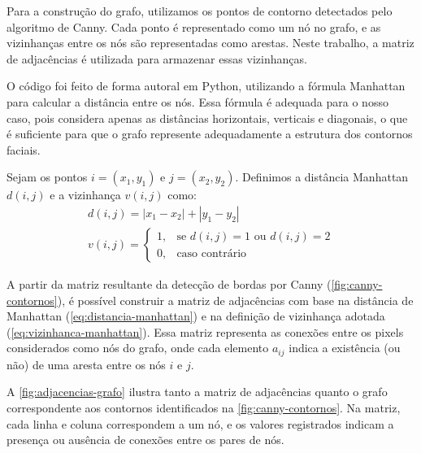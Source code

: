 Para a construção do grafo, utilizamos os pontos de contorno detectados pelo algoritmo de Canny. Cada ponto é representado como um nó no grafo, e as vizinhanças entre os nós são representadas como arestas. Neste trabalho, a matriz de adjacências é utilizada para armazenar essas vizinhanças.

O código foi feito de forma autoral em Python, utilizando a fórmula Manhattan para calcular a distância entre os nós. Essa fórmula é adequada para o nosso caso, pois considera apenas as distâncias horizontais, verticais e diagonais, o que é suficiente para que o grafo represente adequadamente a estrutura dos contornos faciais.

Sejam os pontos \( i = (x_1, y_1) \) e \( j = (x_2, y_2) \). Definimos a distância Manhattan \( d(i, j) \) e a vizinhança \( v(i, j) \) como:
\begin{gather}
    d(i, j) = |x_1 - x_2| + |y_1-y_2| \label{eq:distancia-manhattan}\\
    v(i, j) =
    \begin{cases}
    1, & \text{se } d(i, j) = 1 \text{ ou } d(i, j) = 2 \\
    0, & \text{caso contrário}
    \end{cases}\label{eq:vizinhanca-manhattan}
\end{gather}


A partir da matriz resultante da detecção de bordas por Canny (\autoref{fig:canny-contornos}), é possível construir a matriz de adjacências com base na distância de Manhattan (\ref{eq:distancia-manhattan}) e na definição de vizinhança adotada (\ref{eq:vizinhanca-manhattan}). Essa matriz representa as conexões entre os pixels considerados como nós do grafo, onde cada elemento \( a_{ij} \) indica a existência (ou não) de uma aresta entre os nós \( i \) e \( j \).

A \autoref{fig:adjacencias-grafo} ilustra tanto a matriz de adjacências quanto o grafo correspondente aos contornos identificados na \autoref{fig:canny-contornos}. Na matriz, cada linha e coluna correspondem a um nó, e os valores registrados indicam a presença ou ausência de conexões entre os pares de nós.


